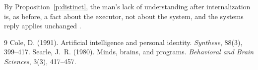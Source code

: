 \documentclass{situationist-preprint}
\begin{document}
By Proposition~\ref{p:distinct}, the man's lack of understanding after internalization is, as before, a fact about the executor, not about the system, and the systems reply applies unchanged \citep{Searle1980}.

\begin{thebibliography}{9}\small
{} Cole, D. (1991). Artificial intelligence and personal identity. \emph{Synthese}, 88(3), 399--417.
 Searle, J.~R. (1980). Minds, brains, and programs. \emph{Behavioral and Brain Sciences}, 3(3), 417--457.
\end{thebibliography}
\end{document}

